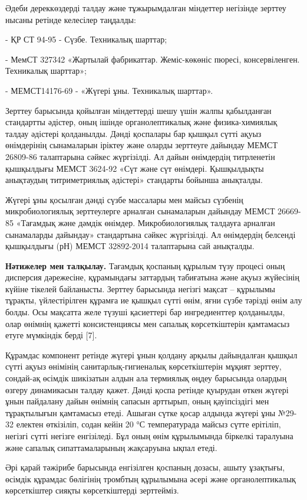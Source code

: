 \begin{multicols}{2}
Әдеби дереккөздерді талдау және тұжырымдалған міндеттер негізінде
зерттеу нысаны ретінде келесілер таңдалды:

- ҚР СТ 94-95 - Сүзбе. Техникалық шарттар;

- МемСТ 327342 «Жартылай фабрикаттар. Жеміс-көкөніс пюресі,
консервіленген. Техникалық шарттар»;

- МЕМСТ14176-69 - «Жүгері ұны. Техникалық шарттар».

Зерттеу барысында қойылған міндеттерді шешу үшін жалпы қабылданған
стандартты әдістер, оның ішінде органолептикалық және физика-химиялық
талдау әдістері қолданылды. Дәнді қоспалары бар қышқыл сүтті ақуыз
өнімдерінің сынамаларын іріктеу және оларды зерттеуге дайындау МЕМСТ
26809-86 талаптарына сәйкес жүргізілді. Ал дайын өнімдердің титрленетін
қышқылдығы МЕМСТ 3624-92 «Сүт және сүт өнімдері. Қышқылдықты анықтаудың
титриметриялық әдістері» стандарты бойынша анықталды.

Жүгері ұны қосылған дәнді сүзбе массалары мен майсыз сүзбенің
микробиологиялық зерттеулерге арналған сынамаларын дайындау МЕМСТ
26669-85 «Тағамдық және дәмдік өнімдер. Микробиологиялық талдауға
арналған сынамаларды дайындау» стандартына сәйкес жүргізілді. Ал
өнімдердің белсенді қышқылдығы (рН) МЕМСТ 32892-2014 талаптарына сай
анықталды.

{\bfseries Нәтижелер мен талқылау.} Тағамдық қоспаның құрылым түзу процесі
оның дисперсия дәрежесіне, құрамындағы заттардың табиғатына және ақуыз
жүйесінің күйіне тікелей байланысты. Зерттеу барысында негізгі мақсат --
құрылымы тұрақты, үйлестірілген құрамға ие қышқыл сүтті өнім, яғни сүзбе
тәрізді өнім алу болды. Осы мақсатта желе түзуші қасиеттері бар
ингредиенттер қолданылды, олар өнімнің қажетті консистенциясы мен
сапалық көрсеткіштерін қамтамасыз етуге мүмкіндік берді {[}7{]}.

Құрамдас компонент ретінде жүгері ұнын қолдану арқылы дайындалған қышқыл
сүтті ақуыз өнімінің санитарлық-гигиеналық көрсеткіштерін мұқият
зерттеу, сондай-ақ өсімдік шикізатын алдын ала термиялық өңдеу барысында
олардың өзгеру динамикасын талдау қажет. Дәнді қоспа ретінде қуырудан
өткен жүгері ұнын пайдалану дайын өнімнің сапасын арттырып, оның
қауіпсіздігі мен тұрақтылығын қамтамасыз етеді. Ашыған сүтке қосар
алдында жүгері ұны №29-32 електен өткізіліп, содан кейін 20 °С
температурада майсыз сүтте ерітіліп, негізгі сүтті негізге енгізіледі.
Бұл оның өнім құрылымында біркелкі таралуына және сапалық
сипаттамаларының жақсаруына ықпал етеді.

Әрі қарай тәжірибе барысында енгізілген қоспаның дозасы, ашыту ұзақтығы,
өсімдік құрамдас бөлігінің тромбтың құрылымына әсері және
органолептикалық көрсеткіштер сияқты көрсеткіштерді зерттейміз.


\end{multicols}

